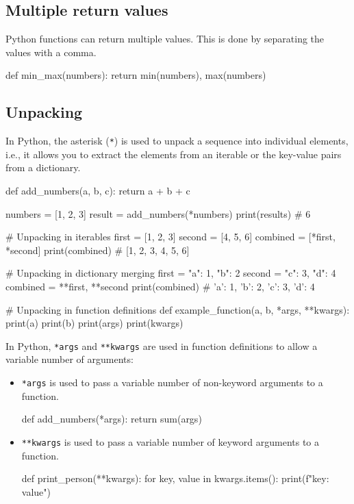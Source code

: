 \subsection*{Multiple return values}

Python functions can return multiple values. This is done by separating the values with a comma.

\begin{codeblock}[language=python]
def min_max(numbers):
    return min(numbers), max(numbers)
\end{codeblock}

\subsection*{Unpacking}

In Python, the asterisk (\texttt{*}) is used to unpack a sequence into individual elements, i.e., it allows you to extract the elements from an iterable or the key-value pairs from a dictionary.

\begin{codeblock}[language=python]
    def add_numbers(a, b, c):
        return a + b + c
    
        numbers = [1, 2, 3]
        result = add_numbers(*numbers)
        print(results) # 6
\end{codeblock}

\begin{codeblock}[language=python]
    # Unpacking in iterables
    first = [1, 2, 3]
    second = [4, 5, 6]
    combined = [*first, *second]
    print(combined) # [1, 2, 3, 4, 5, 6]

    # Unpacking in dictionary merging
    first = {"a": 1, "b": 2}
    second = {"c": 3, "d": 4}
    combined = {**first, **second}
    print(combined) # {'a': 1, 'b': 2, 'c': 3, 'd': 4}

    # Unpacking in function definitions
    def example_function(a, b, *args, **kwargs):
        print(a)
        print(b)
        print(args)
        print(kwargs)
\end{codeblock}

In Python, \texttt{*args} and \texttt{**kwargs} are used in function definitions to allow a variable number of arguments:
\begin{itemize}
    \item \texttt{*args} is used to pass a variable number of non-keyword arguments to a function.
    \begin{codeblock}[language=python]
def add_numbers(*args):
    return sum(args)
    \end{codeblock}
    \item \texttt{**kwargs} is used to pass a variable number of keyword arguments to a function.
    \begin{codeblock}[language=python]
def print_person(**kwargs):
    for key, value in kwargs.items():
        print(f"{key}: {value}")
    \end{codeblock}
\end{itemize}


